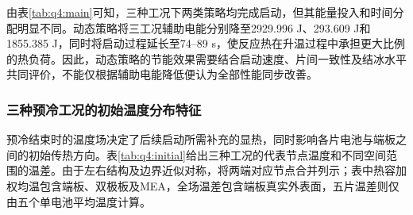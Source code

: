 由表\ref{tab:q4:main}可知，三种工况下两类策略均完成启动，但其能量投入和时间分配明显不同。动态策略将三工况辅助电能分别降至2929.996 J、293.609 J和1855.385 J，同时将启动过程延长至74--89 s，使反应热在升温过程中承担更大比例的热负荷。因此，动态策略的节能效果需要结合启动速度、片间一致性及结冰水平共同评价，不能仅根据辅助电能降低便认为全部性能同步改善。

\subsubsection{三种预冷工况的初始温度分布特征}

预冷结束时的温度场决定了后续启动所需补充的显热，同时影响各片电池与端板之间的初始传热方向。表\ref{tab:q4:initial}给出三种工况的代表节点温度和不同空间范围的温差。由于左右结构及边界近似对称，将两端对应节点合并列示；表中热容加权均温包含端板、双极板及MEA，全场温差包含端板真实外表面，五片温差则仅由五个单电池平均温度计算。

\begin{table}[htbp]
    \centering
    \caption{三种工况的初始温度及空间非均匀性}
    \vspace{0.3cm}
    \label{tab:q4:initial}
    \renewcommand{\arraystretch}{1.5}
\end{table}

